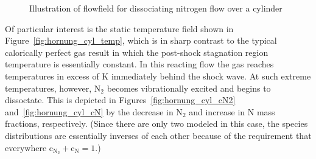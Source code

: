 \begin{figure}[hbtp]
\begin{center}
    \caption{Illustration of flowfield for dissociating nitrogen flow over a cylinder\label{fig:hornung_cyl_flowfield}}
  \end{center}
\end{figure}
Of particular interest is the static temperature field shown in Figure~\ref{fig:hornung_cyl_temp}, which is in sharp contrast to the typical calorically perfect gas result in which the post-shock stagnation region temperature is essentially constant.  In this reacting flow the gas reaches temperatures in excess of \unit[11,000]{K} immediately behind the shock wave.  At such extreme temperatures, however, N$_2$ becomes vibrationally excited and begins to dissoctate.  This is depicted in Figures~\ref{fig:hornung_cyl_cN2} and~\ref{fig:hornung_cyl_cN} by the decrease in N$_2$ and increase in N mass fractions, respectively.  (Since there are only two modeled in this case, the species distributions are essentially inverses of each other because of the requirement that everywhere c$_{\text{N}_2}+$c$_{\text{N}}=1$.)

